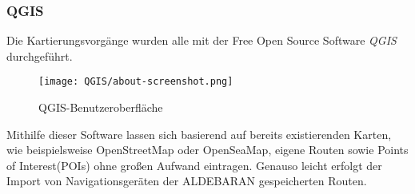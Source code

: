 \subsubsection*{QGIS}
Die Kartierungsvorgänge wurden alle mit der Free Open Source Software \emph{QGIS}\cite{qgis} durchgeführt.
\begin{figure}[ht]
    \centering
    \texttt{[image: QGIS/about-screenshot.png]}
    \caption[fig:qgisabout]{QGIS-Benutzeroberfläche}
\end{figure}
Mithilfe dieser Software lassen sich basierend auf bereits existierenden Karten, 
wie beispielsweise OpenStreetMap\cite{ostrm} oder OpenSeaMap\cite{oseam}, eigene Routen sowie
Points of Interest(POIs) ohne großen Aufwand eintragen. Genauso leicht erfolgt der Import von 
Navigationsgeräten der ALDEBARAN gespeicherten Routen. 

